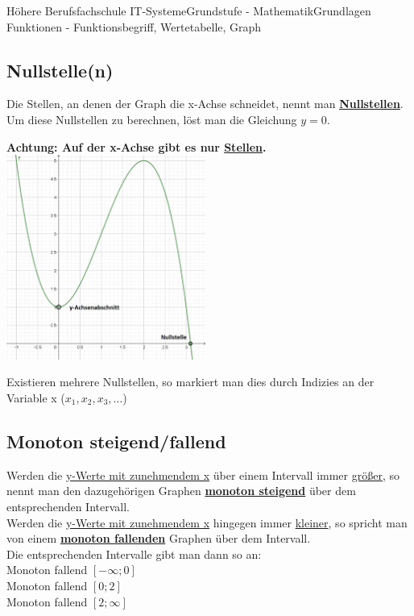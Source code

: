 \documentclass[11pt,twocolumn,oneside,openany,headings=optiontotoc,11pt,numbers=noenddot]{article}
\begin{document}
\begin{worksheet}{Höhere Berufsfachschule IT-Systeme}{Grundstufe - Mathematik}{Grundlagen Funktionen - Funktionsbegriff, Wertetabelle, Graph}
		\subsection*{Nullstelle(n)}
		Die Stellen, an denen der Graph die x-Achse schneidet, nennt man \textbf{\underline{Nullstellen}}. Um diese Nullstellen zu berechnen, löst man die Gleichung \(y = 0\).\\
		\par\bigskip\noindent
		\textbf{Achtung: Auf der x-Achse gibt es nur \underline{Stellen}.}\\
		\includegraphics[width=0.49\textwidth]{../99_Bilder/nyAA.png}\\
		\par\bigskip\noindent
		Existieren mehrere Nullstellen, so markiert man dies durch Indizies an der Variable x (\(x_1, x_2, x_3, \ldots\))
		\subsection*{Monoton steigend/fallend}
		Werden die \underline{y-Werte mit zunehmendem x} über einem Intervall immer \underline{größer}, so nennt man den dazugehörigen Graphen \textbf{\underline{monoton steigend}} über dem entsprechenden Intervall.\\
		Werden die \underline{y-Werte mit zunehmendem x} hingegen immer \underline{kleiner}, so spricht man von einem \textbf{\underline{monoton fallenden}} Graphen über dem Intervall.\\
		Die entsprechenden Intervalle gibt man dann so an:\\
		Monoton fallend \(\left[-\infty;0\right]\)\\
		Monoton fallend \(\left[0;2\right]\)\\
		Monoton fallend \(\left[2;\infty\right]\)

\end{worksheet}
\end{document}

